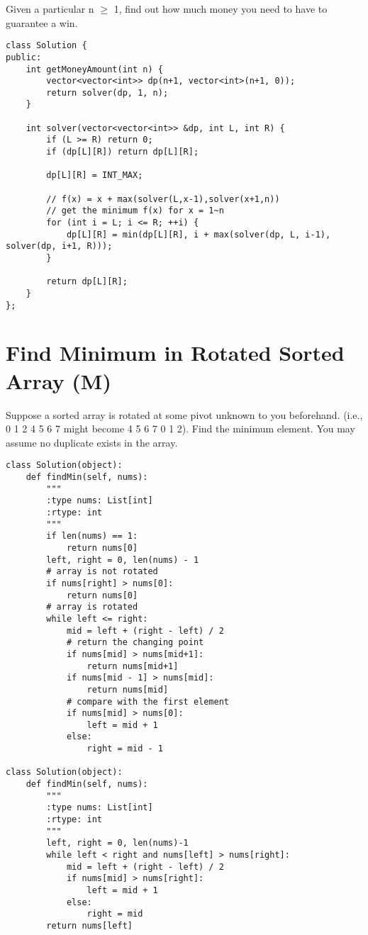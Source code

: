 Given a particular n $\geq$ 1, find out how much money you need to have to guarantee a win.\\

\begin{lstlisting}
class Solution {
public:
    int getMoneyAmount(int n) {
        vector<vector<int>> dp(n+1, vector<int>(n+1, 0));
        return solver(dp, 1, n);
    }
    
    int solver(vector<vector<int>> &dp, int L, int R) {
        if (L >= R) return 0;
        if (dp[L][R]) return dp[L][R];
        
        dp[L][R] = INT_MAX;
        
        // f(x) = x + max(solver(L,x-1),solver(x+1,n))
        // get the minimum f(x) for x = 1~n
        for (int i = L; i <= R; ++i) {
            dp[L][R] = min(dp[L][R], i + max(solver(dp, L, i-1), solver(dp, i+1, R)));
        }
        
        return dp[L][R];
    }
};
\end{lstlisting}


\section{Find Minimum in Rotated Sorted Array (M)}
Suppose a sorted array is rotated at some pivot unknown to you beforehand.
(i.e., 0 1 2 4 5 6 7 might become 4 5 6 7 0 1 2).
Find the minimum element.
You may assume no duplicate exists in the array.\\

\begin{lstlisting}
class Solution(object):
    def findMin(self, nums):
        """
        :type nums: List[int]
        :rtype: int
        """
        if len(nums) == 1:
            return nums[0]
        left, right = 0, len(nums) - 1
        # array is not rotated
        if nums[right] > nums[0]:
            return nums[0]
        # array is rotated
        while left <= right:
            mid = left + (right - left) / 2
            # return the changing point
            if nums[mid] > nums[mid+1]:
                return nums[mid+1]
            if nums[mid - 1] > nums[mid]:
                return nums[mid]
            # compare with the first element
            if nums[mid] > nums[0]:
                left = mid + 1
            else:
                right = mid - 1   
                
class Solution(object):
    def findMin(self, nums):
        """
        :type nums: List[int]
        :rtype: int
        """
        left, right = 0, len(nums)-1
        while left < right and nums[left] > nums[right]:
            mid = left + (right - left) / 2
            if nums[mid] > nums[right]:
                left = mid + 1
            else:
                right = mid
        return nums[left]
\end{lstlisting}


